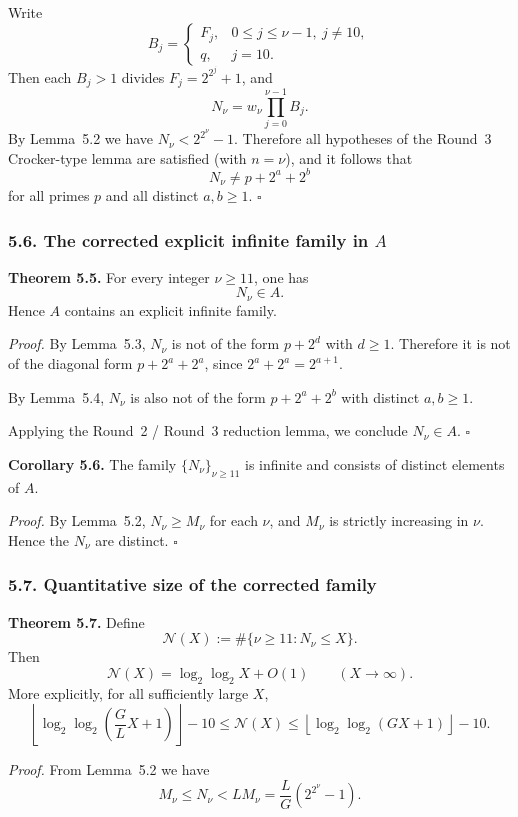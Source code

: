 Write
\[
B_j=
\begin{cases}
F_j,&0\le j\le \nu-1,\ j\neq 10,\\
q,&j=10.
\end{cases}
\]
Then each $B_j>1$ divides $F_j=2^{2^j}+1$, and
\[
N_\nu=w_\nu\prod_{j=0}^{\nu-1}B_j.
\]
By Lemma~5.2 we have $N_\nu<2^{2^\nu}-1$. Therefore all hypotheses of the Round~3 Crocker-type lemma are satisfied (with $n=\nu$), and it follows that
\[
N_\nu\neq p+2^a+2^b
\]
for all primes $p$ and all distinct $a,b\ge 1$. \hfill$\square$

\subsubsection*{5.6. The corrected explicit infinite family in $A$}

\medskip
\noindent\textbf{Theorem 5.5.}
For every integer $\nu\ge 11$, one has
\[
N_\nu\in A.
\]
Hence $A$ contains an explicit infinite family.

\medskip
\noindent\emph{Proof.}
By Lemma~5.3, $N_\nu$ is not of the form $p+2^d$ with $d\ge 1$.
Therefore it is not of the diagonal form $p+2^a+2^a$, since $2^a+2^a=2^{a+1}$.

By Lemma~5.4, $N_\nu$ is also not of the form $p+2^a+2^b$ with distinct $a,b\ge 1$.

Applying the Round~2 / Round~3 reduction lemma, we conclude $N_\nu\in A$. \hfill$\square$

\medskip
\noindent\textbf{Corollary 5.6.}
The family $\{N_\nu\}_{\nu\ge 11}$ is infinite and consists of distinct elements of $A$.

\medskip
\noindent\emph{Proof.}
By Lemma~5.2, $N_\nu\ge M_\nu$ for each $\nu$, and $M_\nu$ is strictly increasing in $\nu$. Hence the $N_\nu$ are distinct. \hfill$\square$

\subsubsection*{5.7. Quantitative size of the corrected family}

\medskip
\noindent\textbf{Theorem 5.7.}
Define
\[
\mathcal{N}(X):=\#\{\nu\ge 11: N_\nu\le X\}.
\]
Then
\[
\mathcal{N}(X)=\log_2\log_2 X+O(1)\qquad (X\to\infty).
\]
More explicitly, for all sufficiently large $X$,
\[
\left\lfloor \log_2\log_2\!\left(\frac{G}{L}X+1\right)\right\rfloor-10
\le
\mathcal{N}(X)
\le
\left\lfloor \log_2\log_2(GX+1)\right\rfloor-10.
\]

\medskip
\noindent\emph{Proof.}
From Lemma~5.2 we have
\[
M_\nu\le N_\nu<LM_\nu=\frac{L}{G}\left(2^{2^\nu}-1\right).
\]

